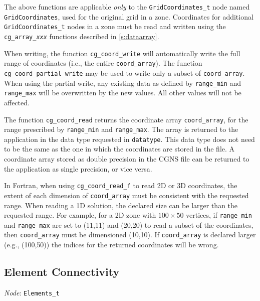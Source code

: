 The above functions are applicable \emph{only} to the 
\texttt{GridCoordinates\_t} node named \texttt{GridCoordinates}, used
for the original grid in a zone.
Coordinates for additional \texttt{GridCoordinates\_t} nodes in a zone
must be read and written using the \texttt{cg\_array\_\textit{xxx}} functions
described in \autoref{s:dataarray}.

When writing, the function \texttt{cg\_coord\_write} will
automatically write the full range of coordinates (i.e., the entire
\texttt{coord\_array}).
The function \texttt{cg\_coord\_partial\_write} may be used to write
only a subset of \texttt{coord\_array}.
When using the partial write, any existing data as defined by
\texttt{range\_min} and \texttt{range\_max} will be overwritten by the
new values.
All other values will not be affected.

The function \texttt{cg\_coord\_read} returns the coordinate array
\texttt{coord\_array}, for the range prescribed by \texttt{range\_min} and
\texttt{range\_max}.
The array is returned to the application in the data type requested in
\texttt{datatype}.
This data type does not need to be the same as the one in which the
coordinates are stored in the file.
A coordinate array stored as double precision in the CGNS file can be
returned to the application as single precision, or vice versa.

In Fortran, when using \texttt{cg\_coord\_read\_f} to read 2D or 3D
coordinates, the extent of each dimension of \texttt{coord\_array} must
be consistent with the requested range.
When reading a 1D solution, the declared size can be larger than the
requested range.
For example, for a 2D zone with $100 \times 50$ vertices, if
\texttt{range\_min} and \texttt{range\_max} are set to (11,11) and (20,20)
to read a subset of the coordinates, then \texttt{coord\_array} must be
dimensioned (10,10).
If \texttt{coord\_array} is declared larger (e.g., (100,50)) the
indices for the returned coordinates will be wrong.

\newpage
\subsection{Element Connectivity}
\label{s:elements}

\noindent
\textit{Node}: \texttt{Elements\_t}

